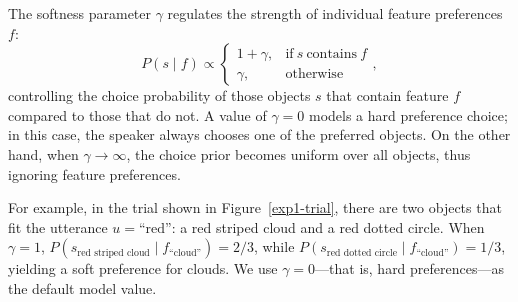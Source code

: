\documentclass[10pt,a4paper]{article}
\begin{document}
The softness parameter $\gamma$ regulates the strength of individual feature preferences $f$:
\begin{equation}
 P(s \mid f) \propto \begin{cases}
1 + \gamma, & \text{if}\ s\ \text{contains}\ f \\
\gamma, & \text{otherwise}
\end{cases},
\end{equation}
controlling the choice probability of those objects $s$ that contain feature $f$ compared to those that do not.  
A value of $\gamma=0$ models a hard preference choice; in this case, the speaker always chooses one of the preferred objects. 
On the other hand, when $\gamma \rightarrow \infty$, the choice prior becomes uniform over all objects, thus ignoring feature preferences. 

For example, in the trial shown in Figure~\ref{exp1-trial}, there are two objects that fit the utterance $u=\text{``red''}$: a red striped cloud and a red dotted circle.
When $\gamma=1$, $P(s_{\textrm{red\ striped\ cloud}}\mid f_{\textrm{``cloud''}}) = 2/3$, while
$P(s_{\textrm{red\ dotted\ circle}}\mid f_{\textrm{``cloud''}})= 1/3$, yielding a soft preference for clouds.
We use $\gamma=0$---that is, hard preferences---as the default model value.
\end{document}
